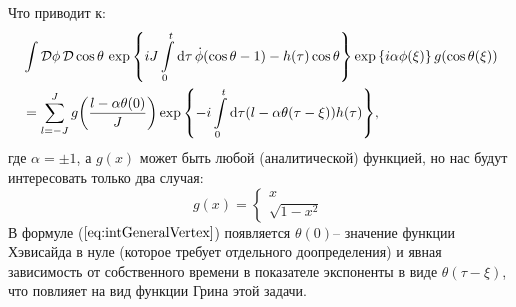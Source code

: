 Что приводит к:
\begin{equation}
	\label{eq:intGeneralVertex}
	\begin{split}
		&\int\mathcal{D}\phi\,\mathcal{D}\cos{\theta}\,\exp{\left\{ iJ\int\limits_0^t \mathrm{d}\tau\,\dot{\phi} (\cos{\theta} - 1) - h(\tau)\cos{\theta}\right\}} \exp{\left\{i \alpha \phi(\xi)\right\}} \, g(\cos{\theta(\xi)})\\
		&=\sum\limits_{l=-J}^J g\!\left( \frac{l-\alpha \theta(0)}{J} \right) \exp{\left\{-i\int\limits_0^t\mathrm{d}\tau (l-\alpha \theta(\tau - \xi))h(\tau)\right\}},
	\end{split}
\end{equation}
где $\alpha=\pm 1$, а $g(x)$ может быть любой (аналитической) функцией, но нас будут интересовать только два случая:
\begin{equation*}
	g(x)=
	\begin{cases}
		x\\
		\sqrt{1-x^2}
	\end{cases}
\end{equation*}
В формуле ($\ref{eq:intGeneralVertex}$) появляется $\theta(0)$-- значение функции Хэвисайда в нуле (которое требует отдельного доопределения) и явная зависимость от собственного времени в показателе экспоненты в виде $\theta(\tau - \xi)$, что повлияет на вид функции Грина этой задачи.